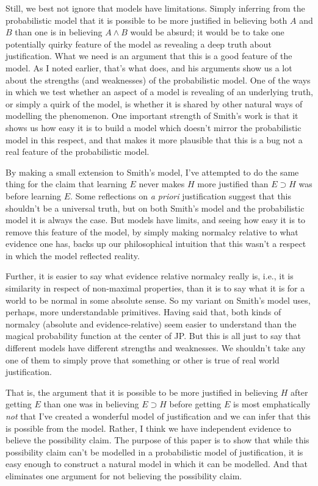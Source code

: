 Still, we best not ignore that models have limitations. Simply inferring from the probabilistic model that it is possible to be more justified in believing both $A$ and $B$ than one is in believing $A \wedge B$ would be absurd; it would be to take one potentially quirky feature of the model as revealing a deep truth about justification. What we need is an argument that this is a good feature of the model. As I noted earlier, that's what \citet{Christensen2005} does, and his arguments show us a lot about the strengths (and weaknesses) of the probabilistic model. One of the ways in which we test whether an aspect of a model is revealing of an underlying truth, or simply a quirk of the model, is whether it is shared by other natural ways of modelling the phenomenon. One important strength of Smith's work is that it shows us how easy it is to build a model which doesn't mirror the probabilistic model in this respect, and that makes it more plausible that this is a bug not a real feature of the probabilistic model.

By making a small extension to Smith's model, I've attempted to do the same thing for the claim that learning $E$ never makes $H$ more justified than $E \supset H$ was before learning $E$. Some reflections on \emph{a priori} justification suggest that this shouldn't be a universal truth, but on both Smith's model and the probabilistic model it is always the case. But models have limits, and seeing how easy it is to remove this feature of the model, by simply making normalcy relative to what evidence one has, backs up our philosophical intuition that this wasn't a respect in which the model reflected reality. 

Further, it is easier to say what evidence relative normalcy really is, i.e., it is similarity in respect of non-maximal properties, than it is to say what it is for a world to be normal in some absolute sense. So my variant on Smith's model uses, perhaps, more understandable primitives. Having said that, both kinds of normalcy (absolute and evidence-relative) seem easier to understand than the magical probability function at the center of JP. But this is all just to say that different models have different strengths and weaknesses. We shouldn't take any one of them to simply prove that something or other is true of real world justification. 

That is, the argument that it is possible to be more justified in believing $H$ after getting $E$ than one was in believing $E \supset H$ before getting $E$ is most emphatically \emph{not} that I've created a wonderful model of justification and we can infer that this is possible from the model. Rather, I think we have independent evidence to believe the possibility claim. The purpose of this paper is to show that while this possibility claim can't be modelled in a probabilistic model of justification, it is easy enough to construct a natural model in which it can be modelled. And that eliminates one argument for not believing the possibility claim.